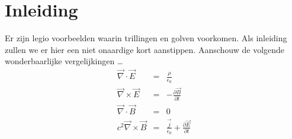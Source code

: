 
\chapter*{Inleiding}

Er zijn legio voorbeelden waarin trillingen en golven voorkomen. Als inleiding zullen we er hier een niet onaardige kort aanstippen. Aanschouw de volgende wonderbaarlijke vergelijkingen \ldots
\begin{eqnarray*}
\vec{\nabla}\cdot\vec{E}&=&\frac{\rho}{\epsilon_0}\\[3mm]
\vec{\nabla}\times\vec{E}&=&-\frac{\partial\vec{B}}{\partial t}\\[3mm]
\vec{\nabla}\cdot\vec{B}&=&0\\[3mm]
c^2\vec{\nabla}\times\vec{B}&=&\frac{\vec{j}}{\epsilon_0}+\frac{\partial\vec{E}}{\partial t}\\
\end{eqnarray*}
